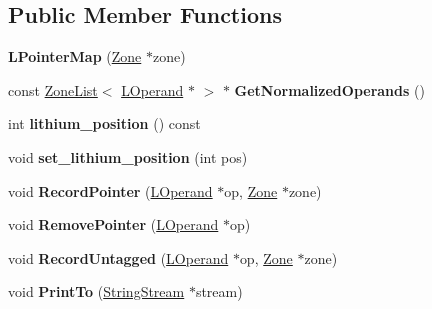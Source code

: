 \subsection*{Public Member Functions}
\begin{DoxyCompactItemize}
\item 
{\bfseries L\+Pointer\+Map} (\hyperlink{classv8_1_1internal_1_1_zone}{Zone} $\ast$zone)\hypertarget{classv8_1_1internal_1_1_l_pointer_map_af9d928d89d37bc25bc0fc7f1e0530ab5}{}\label{classv8_1_1internal_1_1_l_pointer_map_af9d928d89d37bc25bc0fc7f1e0530ab5}

\item 
const \hyperlink{classv8_1_1internal_1_1_zone_list}{Zone\+List}$<$ \hyperlink{classv8_1_1internal_1_1_l_operand}{L\+Operand} $\ast$ $>$ $\ast$ {\bfseries Get\+Normalized\+Operands} ()\hypertarget{classv8_1_1internal_1_1_l_pointer_map_a01434efdb1f4fc0f154dc7b070f78467}{}\label{classv8_1_1internal_1_1_l_pointer_map_a01434efdb1f4fc0f154dc7b070f78467}

\item 
int {\bfseries lithium\+\_\+position} () const \hypertarget{classv8_1_1internal_1_1_l_pointer_map_a99ef0e07aa196221556469408dd08566}{}\label{classv8_1_1internal_1_1_l_pointer_map_a99ef0e07aa196221556469408dd08566}

\item 
void {\bfseries set\+\_\+lithium\+\_\+position} (int pos)\hypertarget{classv8_1_1internal_1_1_l_pointer_map_a6d6d7718f1fa098681136296e576354d}{}\label{classv8_1_1internal_1_1_l_pointer_map_a6d6d7718f1fa098681136296e576354d}

\item 
void {\bfseries Record\+Pointer} (\hyperlink{classv8_1_1internal_1_1_l_operand}{L\+Operand} $\ast$op, \hyperlink{classv8_1_1internal_1_1_zone}{Zone} $\ast$zone)\hypertarget{classv8_1_1internal_1_1_l_pointer_map_af6b32b4928659ef32431288105262a14}{}\label{classv8_1_1internal_1_1_l_pointer_map_af6b32b4928659ef32431288105262a14}

\item 
void {\bfseries Remove\+Pointer} (\hyperlink{classv8_1_1internal_1_1_l_operand}{L\+Operand} $\ast$op)\hypertarget{classv8_1_1internal_1_1_l_pointer_map_a05d6a033b34cc772c439815bba559971}{}\label{classv8_1_1internal_1_1_l_pointer_map_a05d6a033b34cc772c439815bba559971}

\item 
void {\bfseries Record\+Untagged} (\hyperlink{classv8_1_1internal_1_1_l_operand}{L\+Operand} $\ast$op, \hyperlink{classv8_1_1internal_1_1_zone}{Zone} $\ast$zone)\hypertarget{classv8_1_1internal_1_1_l_pointer_map_a7e5a6ba99b8e79e145e4d2a05eeb3d38}{}\label{classv8_1_1internal_1_1_l_pointer_map_a7e5a6ba99b8e79e145e4d2a05eeb3d38}

\item 
void {\bfseries Print\+To} (\hyperlink{classv8_1_1internal_1_1_string_stream}{String\+Stream} $\ast$stream)\hypertarget{classv8_1_1internal_1_1_l_pointer_map_afb542bfe2871d591d300892679c23875}{}\label{classv8_1_1internal_1_1_l_pointer_map_afb542bfe2871d591d300892679c23875}

\end{DoxyCompactItemize}
